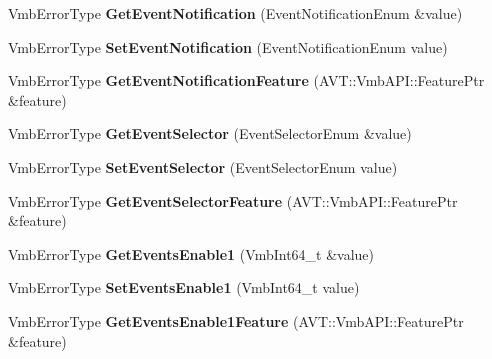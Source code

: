 \begin{DoxyCompactItemize}
\item 
\hypertarget{classMakoCamera_acbf18f78af9853d10ae0848dbff2c531}{Vmb\-Error\-Type {\bfseries Get\-Event\-Notification} (Event\-Notification\-Enum \&value)}\label{classMakoCamera_acbf18f78af9853d10ae0848dbff2c531}

\item 
\hypertarget{classMakoCamera_a010f064fc2f3a55ec458aca11ddfabd6}{Vmb\-Error\-Type {\bfseries Set\-Event\-Notification} (Event\-Notification\-Enum value)}\label{classMakoCamera_a010f064fc2f3a55ec458aca11ddfabd6}

\item 
\hypertarget{classMakoCamera_a3eec93d6de61dc0eab4b88c3a90c075b}{Vmb\-Error\-Type {\bfseries Get\-Event\-Notification\-Feature} (A\-V\-T\-::\-Vmb\-A\-P\-I\-::\-Feature\-Ptr \&feature)}\label{classMakoCamera_a3eec93d6de61dc0eab4b88c3a90c075b}

\item 
\hypertarget{classMakoCamera_a7ea095778e1f4a1771ebd17de176f725}{Vmb\-Error\-Type {\bfseries Get\-Event\-Selector} (Event\-Selector\-Enum \&value)}\label{classMakoCamera_a7ea095778e1f4a1771ebd17de176f725}

\item 
\hypertarget{classMakoCamera_adf9fd9ac06de25867dbcbd944ae26146}{Vmb\-Error\-Type {\bfseries Set\-Event\-Selector} (Event\-Selector\-Enum value)}\label{classMakoCamera_adf9fd9ac06de25867dbcbd944ae26146}

\item 
\hypertarget{classMakoCamera_ac3cc6ed307fdf0d282285fb0bed893fe}{Vmb\-Error\-Type {\bfseries Get\-Event\-Selector\-Feature} (A\-V\-T\-::\-Vmb\-A\-P\-I\-::\-Feature\-Ptr \&feature)}\label{classMakoCamera_ac3cc6ed307fdf0d282285fb0bed893fe}

\item 
\hypertarget{classMakoCamera_a136defe3e7e2dac2832977774260c018}{Vmb\-Error\-Type {\bfseries Get\-Events\-Enable1} (Vmb\-Int64\-\_\-t \&value)}\label{classMakoCamera_a136defe3e7e2dac2832977774260c018}

\item 
\hypertarget{classMakoCamera_a01e953982770b3355fe3dd3bf9fe0fed}{Vmb\-Error\-Type {\bfseries Set\-Events\-Enable1} (Vmb\-Int64\-\_\-t value)}\label{classMakoCamera_a01e953982770b3355fe3dd3bf9fe0fed}

\item 
\hypertarget{classMakoCamera_abe3c6d7347102275f15f1c814e83de7f}{Vmb\-Error\-Type {\bfseries Get\-Events\-Enable1\-Feature} (A\-V\-T\-::\-Vmb\-A\-P\-I\-::\-Feature\-Ptr \&feature)}\label{classMakoCamera_abe3c6d7347102275f15f1c814e83de7f}


\end{DoxyCompactItemize}
